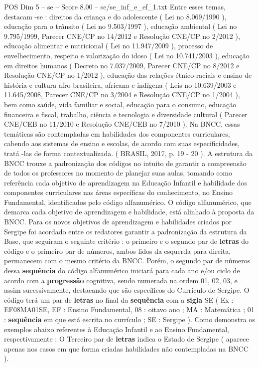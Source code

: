\begin{textsample}{POS Dim 5 – se – Score 8.00 – se/se\_inf\_e\_ef\_1.txt}
Entre esses temas, destacam -se : direitos da criança e do adolescente ( Lei no 8.069/1990 ), educação para o trânsito ( Lei no 9.503/1997 ), educação ambiental ( Lei no 9.795/1999, Parecer CNE/CP no 14/2012 e Resolução CNE/CP no 2/2012 ), educação alimentar e nutricional ( Lei no 11.947/2009 ), processo de envelhecimento, respeito e valorização do idoso ( Lei no 10.741/2003 ), educação em direitos humanos ( Decreto no 7.037/2009, Parecer CNE/CP no 8/2012 e Resolução CNE/CP no 1/2012 ), educação das relações étnico-raciais e ensino de história e cultura afro-brasileira, africana e indígena ( Leis no 10.639/2003 e 11.645/2008, Parecer CNE/CP no 3/2004 e Resolução CNE/CP no 1/2004 ), bem como saúde, vida familiar e social, educação para o consumo, educação financeira e fiscal, trabalho, ciência e tecnologia e diversidade cultural ( Parecer CNE/CEB no 11/2010 e Resolução CNE/CEB no 7/2010 ).
Na BNCC, essas temáticas são contempladas em habilidades dos componentes curriculares, cabendo aos sistemas de ensino e escolas, de acordo com suas especificidades, tratá -las de forma contextualizada. ( BRASIL, 2017, p. 19 - 20 ).
A estrutura da BNCC trouxe a padronização dos códigos no intuito de garantir a compreensão de todos os professores no momento de planejar suas aulas, tomando como referência cada objetivo de aprendizagem na Educação Infantil e habilidade dos componentes curriculares nas áreas específicas do conhecimento, no Ensino Fundamental, identificados pelo código alfanumérico.
O código alfanumérico, que demarca cada objetivo de aprendizagem e habilidade, está alinhado à proposta da BNCC.
Para os novos objetivos de aprendizagem e habilidades criados por Sergipe foi acordado entre os redatores garantir a padronização da estrutura da Base, que seguiram o seguinte critério : o primeiro e o segundo par de \textbf{letras} do código e o primeiro par de números, ambos lidos da esquerda para direita, permanecem com o mesmo critério da BNCC.
Porém, o segundo par de números dessa \textbf{sequência} do código alfanumérico iniciará para cada ano e/ou ciclo de acordo com a \textbf{progressão} cognitiva, sendo numerada na ordem 01, 02, 03, e assim sucessivamente, destacando que são específicos do Currículo de Sergipe.
O código terá um par de \textbf{letras} no final da \textbf{sequência} com a \textbf{sigla} SE ( Ex : EF08MA01SE, EF : Ensino Fundamental, 08 : oitavo ano ; MA : Matemática ; 01 : \textbf{sequência} em que está escrita no currículo ; SE : Sergipe ).
Como demonstra os exemplos abaixo referentes à Educação Infantil e ao Ensino Fundamental, respectivamente : O Terceiro par de \textbf{letras} indica o Estado de Sergipe ( aparece apenas nos casos em que forma criadas habilidades não contempladas na BNCC ).

\end{textsample}
